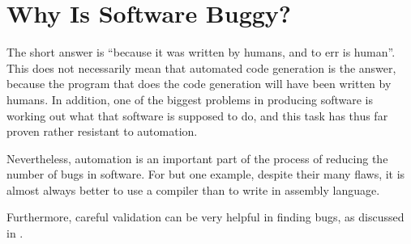 
\section{Why Is Software Buggy?}
\label{sec:app:questions:Why Is Software Buggy?}

The short answer is ``because it was written by humans, and to err
is human''.
This does not necessarily mean that automated code generation is
the answer, because the program that does the code generation will
have been written by humans.
In addition, one of the biggest problems in producing software is
working out what that software is supposed to do, and this task
has thus far proven rather resistant to automation.

Nevertheless, automation is an important part of the process of reducing
the number of bugs in software.
For but one example, despite their many flaws, it is almost always better
to use a compiler than to write in assembly language.

Furthermore, careful validation can be very helpful in finding bugs,
as discussed in
.
